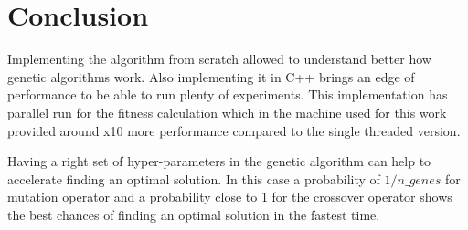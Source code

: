 \documentclass[12pt,oneside,a4paper]{article}
\begin{document}
    \newpage
    \section{Conclusion}
    Implementing the algorithm from scratch allowed to understand better how genetic algorithms work.
    Also implementing it in C++ brings an edge of performance to be able to run plenty of experiments.
    This implementation has parallel run for the fitness calculation which in the machine used for this work provided
    around x10 more performance compared to the single threaded version.

    Having a right set of hyper-parameters in the genetic algorithm can help to accelerate finding an optimal solution.
    In this case a probability of \(1/n\_genes\) for mutation operator and a probability close to 1 for the crossover
    operator shows the best chances of finding an optimal solution in the fastest time.



    \newpage
    
    
\end{document}

